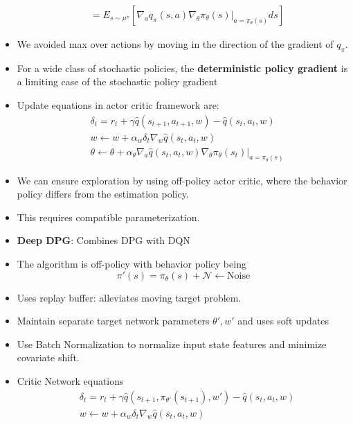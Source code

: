 \documentclass[a4paper]{article}
\begin{document}
\begin{itemize}
\begin{equation*}
\begin{split}
            &=E_{s\sim \mu^\pi}[\nabla_aq_\pi(s,a)\nabla_\theta \pi_\theta(s)|_{a=\pi_\theta(s)}ds]
        \end{split}
    \end{equation*}
    \item We avoided max over actions by moving in the direction of the gradient of $q_\pi$.
    \item For a wide class of stochastic policies, the \textbf{deterministic policy gradient} is a limiting case of the stochastic policy gradient
    \item Update equations in actor critic framework are:
    \begin{equation*}
        \begin{split}
            &\delta_t=r_t+\gamma \hat{q}(s_{t+1},a_{t+1},w)-\hat{q}(s_t,a_t,w)\\
            &w\gets w+\alpha_w\delta_t\nabla_w\hat{q}(s_t,a_t,w)\\
            &\theta \gets \theta+\alpha_\theta \nabla_a\hat{q}(s_t,a_t,w)\nabla_\theta\pi_\theta(s_t)|_{a=\pi_\theta(s)}
        \end{split}
    \end{equation*}
    \item We can ensure exploration by using off-policy actor critic, where the behavior policy differs from the estimation policy.
    \item This requires compatible parameterization.
    \item \textbf{Deep DPG}: Combines DPG with DQN
    \item The algorithm is off-policy with behavior policy being
    \begin{equation*}
        \pi'(s)=\pi_\theta(s)+\mathcal{N}\gets \text{Noise}
    \end{equation*}
    \item Uses replay buffer: alleviates moving target problem.
    \item Maintain separate target network parameters $\theta',w'$ and uses soft updates
    \item Use Batch Normalization to normalize input state features and minimize covariate shift.
    \item Critic Network equations
    \begin{equation*}
        \begin{split}
            &\delta_t=r_t+\gamma \hat{q}(s_{t+1},\pi_{\theta'}(s_{t+1}),w')-\hat{q}(s_t,a_t,w)\\
            &w\gets w+\alpha_w\delta_t\nabla_w\hat{q}(s_t,a_t,w)

\end{split}
\end{equation*}
\end{itemize}
\end{document}
